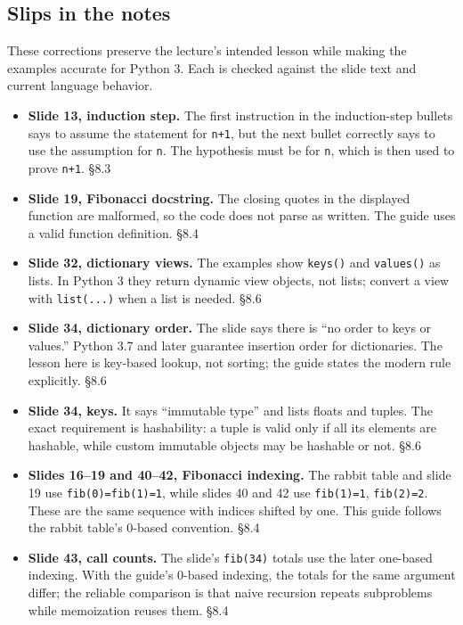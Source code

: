 \documentclass[11pt]{article}
\begin{document}
\begin{keepsection}
\section{Slips in the notes}

These corrections preserve the lecture’s intended lesson while making the examples accurate for Python 3. Each is checked against the slide text and current language behavior.

\begin{itemize}
\item \textbf{Slide 13, induction step.} The first instruction in the induction-step bullets says to assume the statement for \texttt{n+1}, but the next bullet correctly says to use the assumption for \texttt{n}. The hypothesis must be for \texttt{n}, which is then used to prove \texttt{n+1}. \hfill{\small\color{FAUblue}§8.3}
\item \textbf{Slide 19, Fibonacci docstring.} The closing quotes in the displayed function are malformed, so the code does not parse as written. The guide uses a valid function definition. \hfill{\small\color{FAUblue}§8.4}
\item \textbf{Slide 32, dictionary views.} The examples show \texttt{keys()} and \texttt{values()} as lists. In Python 3 they return dynamic view objects, not lists; convert a view with \texttt{list(...)} when a list is needed. \hfill{\small\color{FAUblue}§8.6}
\item \textbf{Slide 34, dictionary order.} The slide says there is “no order to keys or values.” Python 3.7 and later guarantee insertion order for dictionaries. The lesson here is key-based lookup, not sorting; the guide states the modern rule explicitly. \hfill{\small\color{FAUblue}§8.6}
\item \textbf{Slide 34, keys.} It says “immutable type” and lists floats and tuples. The exact requirement is hashability: a tuple is valid only if all its elements are hashable, while custom immutable objects may be hashable or not. \hfill{\small\color{FAUblue}§8.6}
\item \textbf{Slides 16–19 and 40–42, Fibonacci indexing.} The rabbit table and slide 19 use \texttt{fib(0)=fib(1)=1}, while slides 40 and 42 use \texttt{fib(1)=1}, \texttt{fib(2)=2}. These are the same sequence with indices shifted by one. This guide follows the rabbit table’s 0-based convention. \hfill{\small\color{FAUblue}§8.4}
\item \textbf{Slide 43, call counts.} The slide’s \texttt{fib(34)} totals use the later one-based indexing. With the guide’s 0-based indexing, the totals for the same argument differ; the reliable comparison is that naive recursion repeats subproblems while memoization reuses them. \hfill{\small\color{FAUblue}§8.4}
\end{itemize}
\end{keepsection}
\end{document}

